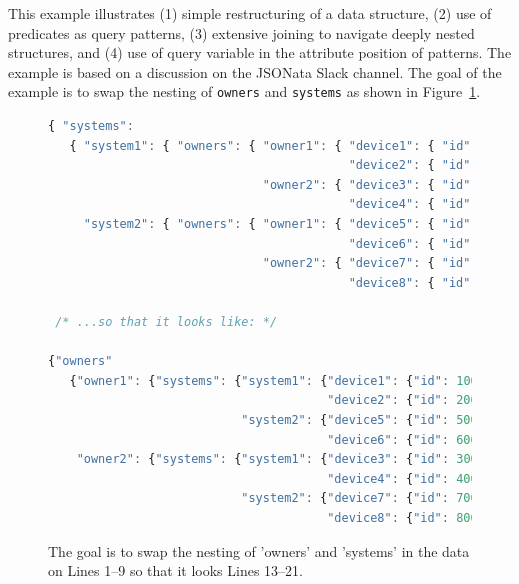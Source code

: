 \documentclass[9pt,letterpaper]{article}
\newcommand{\stt}[1]{\texttt{#1}} %
\begin{document}
This example illustrates (1) simple restructuring of a data structure, (2) use of predicates as query patterns, (3) extensive joining
to navigate deeply nested structures, and (4) use of query variable in the attribute position of patterns.
The example is based on a discussion on the JSONata Slack channel.
The goal of the example is to swap the nesting of \stt{owners} and \stt{systems} as shown in Figure~\ref{data:restruct}.

\begin{figure}[H]
  \caption{The goal is to swap the nesting of 'owners' and 'systems' in the data on Lines 1--9
  so that it looks Lines 13--21.}
 \label{data:restruct}
\begin{lstlisting}[language=JavaScript,basicstyle=\ttfamily\scriptsize,numberstyle=\scriptsize]
{ "systems":
   { "system1": { "owners": { "owner1": { "device1": { "id": 100, "status": "Ok" },
                                          "device2": { "id": 200, "status": "Ok" }},
                              "owner2": { "device3": { "id": 300, "status": "Ok" },
                                          "device4": { "id": 400, "status": "Ok" }}}},
     "system2": { "owners": { "owner1": { "device5": { "id": 500, "status": "Ok" },
                                          "device6": { "id": 600, "status": "Ok" }},
                              "owner2": { "device7": { "id": 700, "status": "Ok" },
                                          "device8": { "id": 800, "status": "Ok" }}}}}}

 /* ...so that it looks like: */

{"owners"
   {"owner1": {"systems": {"system1": {"device1": {"id": 100, "status": "Ok"},
                                       "device2": {"id": 200, "status": "Ok"}},
                           "system2": {"device5": {"id": 500, "status": "Ok"},
                                       "device6": {"id": 600, "status": "Ok"}}},
    "owner2": {"systems": {"system1": {"device3": {"id": 300, "status": "Ok"},
                                       "device4": {"id": 400, "status": "Ok"}},
                           "system2": {"device7": {"id": 700, "status": "Ok"},
                                       "device8": {"id": 800, "status": "Ok"}}}}}))))

\end{lstlisting}
\end{figure}
\end{document}
